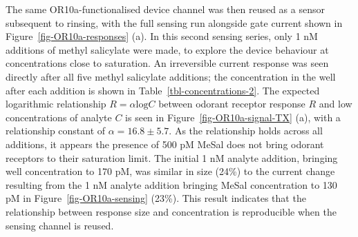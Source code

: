 \documentclass[
  a4paper,
]{scrbook}
\begin{document}
The same OR10a-functionalised device channel was then reused as a sensor
subsequent to rinsing, with the full sensing run alongside gate current
shown in Figure~\ref{fig-OR10a-responses} (a). In this second sensing
series, only 1 nM additions of methyl salicylate were made, to explore
the device behaviour at concentrations close to saturation. An
irreversible current response was seen directly after all five methyl
salicylate additions; the concentration in the well after each addition
is shown in Table~\ref{tbl-concentrations-2}. The expected logarithmic
relationship \(R = \alpha\textrm{log}C\) between odorant receptor
response \(R\) and low concentrations of analyte \(C\) is seen in
Figure~\ref{fig-OR10a-signal-TX} (a), with a relationship constant of
\(\alpha = 16.8 \pm 5.7\). As the relationship holds across all
additions, it appears the presence of 500 pM MeSal does not bring
odorant receptors to their saturation limit. The initial 1 nM analyte
addition, bringing well concentration to 170 pM, was similar in size
(24\%) to the current change resulting from the 1 nM analyte addition
bringing MeSal concentration to 130 pM in Figure~\ref{fig-OR10a-sensing}
(23\%). This result indicates that the relationship between response
size and concentration is reproducible when the sensing channel is
reused.
\end{document}
